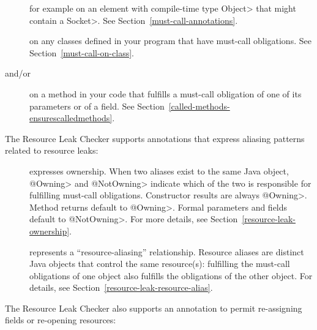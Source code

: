\begin{description}

\item[]
for example on an element with compile-time type \<Object> that might contain a \<Socket>.
See Section~\ref{must-call-annotations}.

\item[]
on any classes defined in your program that have must-call obligations. See Section~\ref{must-call-on-class}.

\item[ and/or
      ]
on a method in your code that fulfills a must-call obligation of one of its parameters or of a field.
See Section~\ref{called-methods-ensurescalledmethods}.

\end{description}

The Resource Leak Checker supports annotations that express
aliasing patterns related to resource leaks:

\begin{description}

\item[]
\item[]
  expresses ownership.  When two aliases exist to the same Java object,
  \<@Owning> and \<@NotOwning> indicate which of the two is responsible for
  fulfilling must-call obligations.
  Constructor results are always \<@Owning>. Method returns default to
  \<@Owning>.  Formal parameters and fields default to \<@NotOwning>.
  For more details, see Section~\ref{resource-leak-ownership}.

\item[]
  represents a ``resource-aliasing'' relationship.  Resource aliases are
  distinct Java objects that control the same resource(s):
  fulfilling the must-call obligations of one object also
  fulfills the obligations of the other object.  For details,
  see Section~\ref{resource-leak-resource-alias}.

\end{description}

The Resource Leak Checker also supports an annotation to permit re-assigning
fields or re-opening resources:

